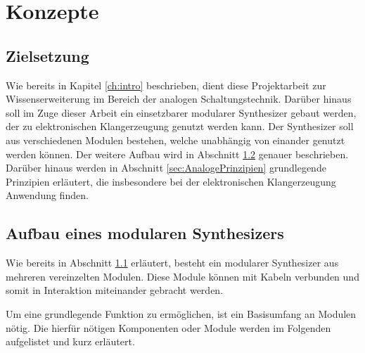 \chapter{Konzepte}
\label{ch:concept}

\section{Zielsetzung}
\label{sec:zielsetzung}
Wie bereits in Kapitel \ref{ch:intro} beschrieben, dient diese Projektarbeit zur Wissenserweiterung im Bereich der analogen Schaltungstechnik.
Darüber hinaus soll im Zuge dieser Arbeit ein einsetzbarer modularer Synthesizer gebaut werden, der zu elektronischen Klangerzeugung genutzt werden kann. 
Der Synthesizer soll aus verschiedenen Modulen bestehen, welche unabhängig von einander genutzt werden können. 
Der weitere Aufbau wird in Abschnitt \ref{sec:AufbauSynth} genauer beschrieben. 
Darüber hinaus werden in Abschnitt \ref{sec:AnalogePrinzipien} grundlegende Prinzipien erläutert, die insbesondere bei der elektronischen Klangerzeugung Anwendung finden.


\section{Aufbau eines modularen Synthesizers}
\label{sec:AufbauSynth}
Wie bereits in Abschnitt \ref{sec:zielsetzung} erläutert, besteht ein modularer Synthesizer aus mehreren vereinzelten Modulen. 
Diese Module können mit Kabeln verbunden und somit in Interaktion miteinander gebracht werden. 

Um eine grundlegende Funktion zu ermöglichen, ist ein Basisumfang an Modulen nötig.
Die hierfür nötigen Komponenten oder Module werden im Folgenden aufgelistet und kurz erläutert.

